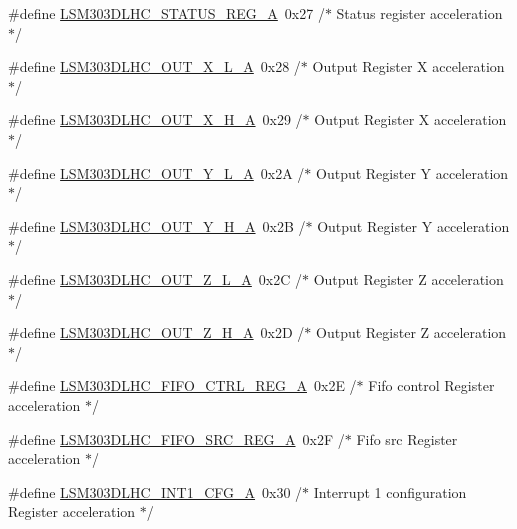\begin{DoxyCompactItemize}
\#define \hyperlink{group__STM32F3__DISCOVERY__LSM303DLHC__Exported__Constants_ga00a4ae5f8b494e215102c98ef6098f8c}{L\+S\+M303\+D\+L\+H\+C\+\_\+\+S\+T\+A\+T\+U\+S\+\_\+\+R\+E\+G\+\_\+\+A}~0x27  /$\ast$ Status register acceleration $\ast$/
\item 
\#define \hyperlink{group__STM32F3__DISCOVERY__LSM303DLHC__Exported__Constants_ga711db747043591e92fd67892a6d009f2}{L\+S\+M303\+D\+L\+H\+C\+\_\+\+O\+U\+T\+\_\+\+X\+\_\+\+L\+\_\+\+A}~0x28  /$\ast$ Output Register X acceleration $\ast$/
\item 
\#define \hyperlink{group__STM32F3__DISCOVERY__LSM303DLHC__Exported__Constants_gabe5f41bae255150539950425bd60eb0a}{L\+S\+M303\+D\+L\+H\+C\+\_\+\+O\+U\+T\+\_\+\+X\+\_\+\+H\+\_\+\+A}~0x29  /$\ast$ Output Register X acceleration $\ast$/
\item 
\#define \hyperlink{group__STM32F3__DISCOVERY__LSM303DLHC__Exported__Constants_ga5a12f5fe8f03a20e82cf0647589c469f}{L\+S\+M303\+D\+L\+H\+C\+\_\+\+O\+U\+T\+\_\+\+Y\+\_\+\+L\+\_\+\+A}~0x2\+A  /$\ast$ Output Register Y acceleration $\ast$/
\item 
\#define \hyperlink{group__STM32F3__DISCOVERY__LSM303DLHC__Exported__Constants_ga17498057cd5a68371ca665422c4d77e1}{L\+S\+M303\+D\+L\+H\+C\+\_\+\+O\+U\+T\+\_\+\+Y\+\_\+\+H\+\_\+\+A}~0x2\+B  /$\ast$ Output Register Y acceleration $\ast$/
\item 
\#define \hyperlink{group__STM32F3__DISCOVERY__LSM303DLHC__Exported__Constants_gadfd0d20cab11c8c08cb096d65cf1a25b}{L\+S\+M303\+D\+L\+H\+C\+\_\+\+O\+U\+T\+\_\+\+Z\+\_\+\+L\+\_\+\+A}~0x2\+C  /$\ast$ Output Register Z acceleration $\ast$/
\item 
\#define \hyperlink{group__STM32F3__DISCOVERY__LSM303DLHC__Exported__Constants_ga26af5a52b2a6d0825489092a5deadc85}{L\+S\+M303\+D\+L\+H\+C\+\_\+\+O\+U\+T\+\_\+\+Z\+\_\+\+H\+\_\+\+A}~0x2\+D  /$\ast$ Output Register Z acceleration $\ast$/
\item 
\#define \hyperlink{group__STM32F3__DISCOVERY__LSM303DLHC__Exported__Constants_gad4b5987626ddafff37cd9c0d86ee8918}{L\+S\+M303\+D\+L\+H\+C\+\_\+\+F\+I\+F\+O\+\_\+\+C\+T\+R\+L\+\_\+\+R\+E\+G\+\_\+\+A}~0x2\+E  /$\ast$ Fifo control Register acceleration $\ast$/
\item 
\#define \hyperlink{group__STM32F3__DISCOVERY__LSM303DLHC__Exported__Constants_gaeeaef13e79117904441dabb6dbee0e03}{L\+S\+M303\+D\+L\+H\+C\+\_\+\+F\+I\+F\+O\+\_\+\+S\+R\+C\+\_\+\+R\+E\+G\+\_\+\+A}~0x2\+F  /$\ast$ Fifo src Register acceleration $\ast$/
\item 
\#define \hyperlink{group__STM32F3__DISCOVERY__LSM303DLHC__Exported__Constants_ga94d36d376d46826689e521a7248d88a2}{L\+S\+M303\+D\+L\+H\+C\+\_\+\+I\+N\+T1\+\_\+\+C\+F\+G\+\_\+\+A}~0x30  /$\ast$ Interrupt 1 configuration Register acceleration $\ast$/

\end{DoxyCompactItemize}
